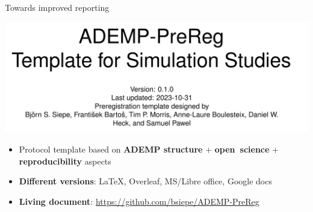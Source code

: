 \documentclass[english, 12pt, aspectratio=169]{beamer}
\begin{document}




\begin{frame}{Towards improved reporting}
  \begin{block}{}
  \centering
  \includegraphics[width = 0.6\linewidth,frame]{pics/ademprereg.png}

  \begin{itemize}
  \pause
    \item Protocol template based on \alert{\textbf{ADEMP structure}}
          \citep{Morris2019} + \alert{\textbf{open~science}} +
          \alert{\textbf{reproducibility}} aspects
    \pause
    \item \alert{\textbf{Different versions}}: \LaTeX, Overleaf, MS/Libre office, Google
    docs
    \pause
    \item \alert{\textbf{Living
          document}}:          \href{https://github.com/bsiepe/ADEMP-PreReg}{https://github.com/bsiepe/ADEMP-PreReg}
    \end{itemize}
  \end{block}

  \vspace{-1.5em}
  \nocite{Siepe2023}

\end{frame}
\end{document}

